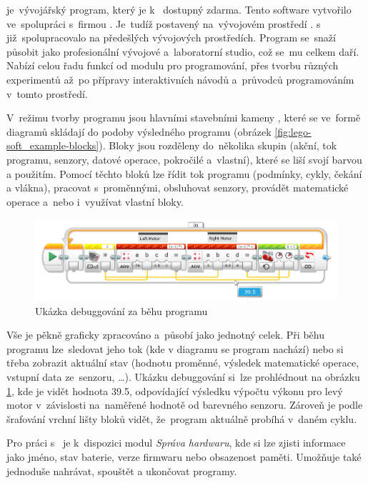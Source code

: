 \legoSW{} je~vývojářský program, který je k~\EVthree{} dostupný zdarma. 
Tento  software vytvořilo \lego{} ve~spolupráci s~firmou \NI{}. 
Je~tudíž postavený na~vývojovém prostředí \labview{}. 
\lego{} s~\NI{} již~spolupracovalo na předešlých vývojových prostředích. %
Program se~snaží působit jako profesionální vývojové a~laboratorní studio, což se~mu celkem daří.
Nabízí celou řadu funkcí od modulu pro programování, přes tvorbu různých experimentů až~po přípravy interaktivních návodů a~průvodců programováním v~tomto prostředí.

V~režimu tvorby programu jsou hlavními stavebními kameny \EVblocks, které se ve~formě diagramů skládají do podoby výsledného programu (obrázek \ref{fig:lego-soft_example-blocks}).
Bloky jsou rozděleny do~několika skupin (akční, tok programu, senzory, datové operace, pokročilé a~vlastní), které se liší svojí barvou a použitím. 
Pomocí těchto bloků lze řídit tok programu (podmínky, cykly, čekání a vlákna), pracovat s~proměnnými, obsluhovat senzory, provádět matematické operace a~nebo i~využívat vlastní bloky.

\begin{figure}[h]
	\centering
	\includegraphics[width=\textwidth]{images/lego-soft_live-debugging_line-advance.png}
	\caption{Ukázka debuggování za běhu programu}
	\label{fig:lego-soft_live-debugging_line-advance}
\end{figure}

Vše je pěkně graficky zpracováno a~působí jako jednotný celek. 
Při běhu programu lze~sledovat jeho tok (kde v diagramu se program nachází) nebo si třeba zobrazit aktuální stav (hodnotu proměnné, výsledek matematické operace, vstupní data ze~senzoru, \dots). 
Ukázku debuggování si~lze prohlédnout na obrázku \ref{fig:lego-soft_live-debugging_line-advance}, kde je vidět hodnota 39.5, odpovídající výsledku výpočtu výkonu pro levý motor v~závislosti na~naměřené hodnotě od barevného senzoru.
Zároveň je podle šrafování vrchní lišty bloků vidět, že~program aktuálně probíhá v~daném cyklu.

Pro práci s~ je k~dispozici modul {\it Správa hardwaru}, kde si lze zjisti informace jako jméno, stav baterie, verze firmwaru nebo obsazenost paměti. 
Umožňuje také jednoduše nahrávat, spouštět a ukončovat programy. 

